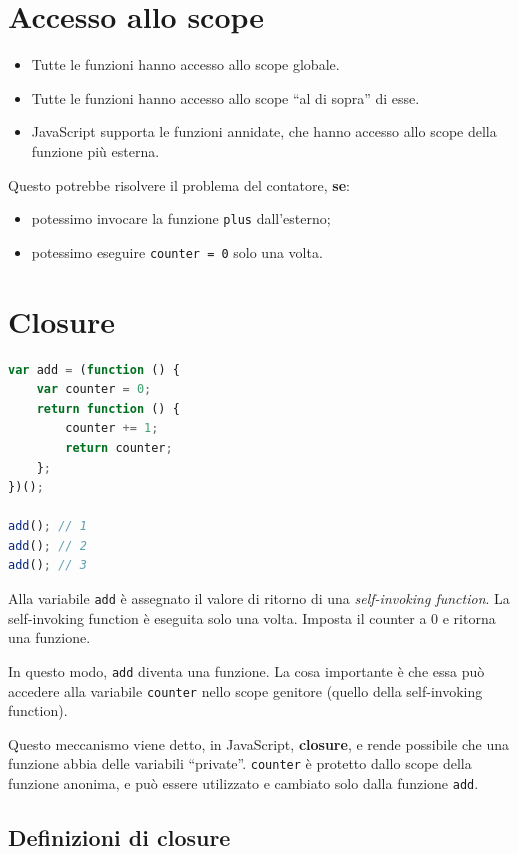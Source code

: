 \section{Accesso allo scope}

\begin{itemize}
    \item Tutte le funzioni hanno accesso allo scope globale.
    \item Tutte le funzioni hanno accesso allo scope ``al di sopra'' di esse.
    \item JavaScript supporta le funzioni annidate, che hanno accesso allo scope della funzione più esterna.
\end{itemize}

Questo potrebbe risolvere il problema del contatore, \textbf{se}:
\begin{itemize}
    \item potessimo invocare la funzione \texttt{plus} dall'esterno;
    \item potessimo eseguire \texttt{counter = 0} solo una volta.
\end{itemize}

\section{Closure}

\begin{lstlisting}[language=JavaScript, caption=Esempio di closure]
var add = (function () {
    var counter = 0;
    return function () {
        counter += 1;
        return counter;
    };
})();

add(); // 1
add(); // 2
add(); // 3
\end{lstlisting}

Alla variabile \texttt{add} è assegnato il valore di ritorno di una \textit{self-invoking function}. La self-invoking function è eseguita solo una volta. Imposta il counter a 0 e ritorna una funzione.

In questo modo, \texttt{add} diventa una funzione. La cosa importante è che essa può accedere alla variabile \texttt{counter} nello scope genitore (quello della self-invoking function).

Questo meccanismo viene detto, in JavaScript, \textbf{closure}, e rende possibile che una funzione abbia delle variabili ``private''. \texttt{counter} è protetto dallo scope della funzione anonima, e può essere utilizzato e cambiato solo dalla funzione \texttt{add}.

\subsection{Definizioni di closure}

